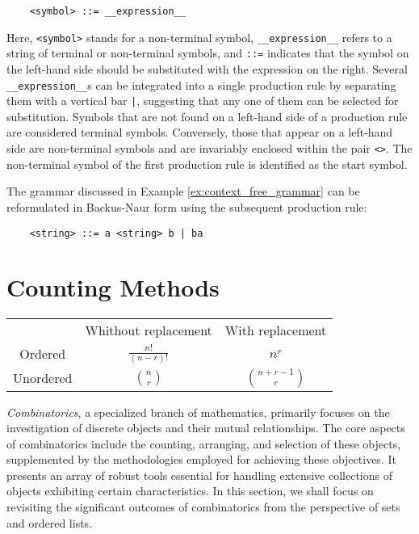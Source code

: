 \begin{verbatim}
    <symbol> ::= __expression__
\end{verbatim}

Here, \texttt{<symbol>} stands for a non-terminal symbol, \texttt{\_\_expression\_\_} refers to a string of terminal or non-terminal symbols, and \texttt{::=} indicates that the symbol on the left-hand side should be substituted with the expression on the right. Several \texttt{\_\_expression\_\_}s can be integrated into a single production rule by separating them with a vertical bar \texttt{|}, suggesting that any one of them can be selected for substitution. Symbols that are not found on a left-hand side of a production rule are considered terminal symbols. Conversely, those that appear on a left-hand side are non-terminal symbols and are invariably enclosed within the pair \texttt{<>}. The non-terminal symbol of the first production rule is identified as the start symbol.

\begin{example}
The grammar discussed in Example \ref{ex:context_free_grammar} can be reformulated in Backus-Naur form using the subsequent production rule:
\begin{verbatim}
    <string> ::= a <string> b | ba
\end{verbatim}
\end{example}

%
%

\section{Counting Methods}
\label{sec:counting}

{\color{red}
\begin{center}
\begin{tabular}{ c c c }
  & Whithout replacement & With replacement \\ 
 Ordered    & $\frac{n!}{(n-r)!}$ & $n^r$ \\  
 Unordered & $\binom{n}{r}$ & $\binom{n+r-1}{r}$    
\end{tabular}
\end{center}
}

\emph{Combinatorics}, a specialized branch of mathematics, primarily focuses on the investigation of discrete objects and their mutual relationships. The core aspects of combinatorics include the counting, arranging, and selection of these objects, supplemented by the methodologies employed for achieving these objectives. It presents an array of robust tools essential for handling extensive collections of objects exhibiting certain characteristics. In this section, we shall focus on revisiting the significant outcomes of combinatorics from the perspective of sets and ordered lists.

